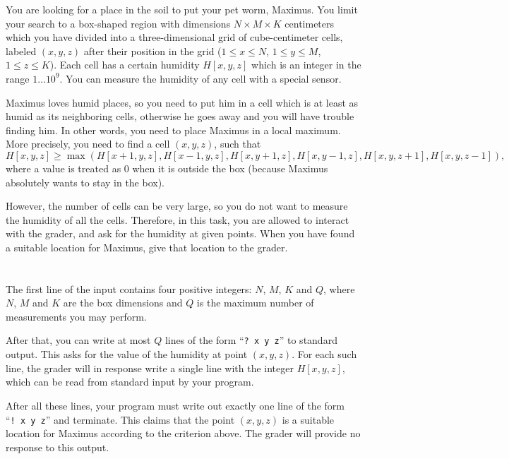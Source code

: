 \ifx\boi\undefined\fi
\def\version{jury-1}

You are looking for a place in the soil to put your pet worm, Maximus. You limit your search to a box-shaped region with dimensions $N \times M \times K$ centimeters which you have divided into a three-dimensional grid of cube-centimeter cells, labeled $(x,y,z)$ after their position in the grid ($1 \le x \le N$, $1 \le y \le M$, $1 \le z \le K$). Each cell has a certain humidity $H[x,y,z]$ which is an integer in the range $1 \dots 10^9$. You can measure the humidity of any cell with a special sensor.

Maximus loves humid places, so you need to put him in a cell which is at least as humid as its neighboring cells, otherwise he goes away and you will have trouble finding him.
In other words, you need to place Maximus in a local maximum.
More precisely, you need to find a cell $(x,y,z)$, such that
$$
H[x,y,z] \ge \max(H[x+1,y,z], H[x-1,y,z], H[x,y+1,z], H[x,y-1,z], H[x,y,z+1], H[x,y,z-1]),
$$
where a value is treated as $0$ when it is outside the box (because Maximus absolutely wants to stay in the box).

However, the number of cells can be very large, so you do not want to measure the humidity of all the cells. Therefore, in this task, you are allowed to interact with the grader, and ask for the humidity at given points.
When you have found a suitable location for Maximus, give that location to the grader.

\section*{\interactivity}
The first line of the input contains four positive integers: $N$, $M$, $K$ and $Q$, where $N$, $M$ and $K$ are the box dimensions and $Q$ is the maximum number of measurements you may perform.

After that, you can write at most $Q$ lines of the form ``\texttt{?\ x y z}'' to standard output.
This asks for the value of the humidity at point $(x, y, z)$.
For each such line, the grader will in response write a single line with the integer $H[x,y,z]$, which can be read from standard input by your program.

After all these lines, your program must write out exactly one line of the form ``\texttt{!\ x y z}'' and terminate.
This claims that the point $(x, y, z)$ is a suitable location for Maximus according to the criterion above.
The grader will provide no response to this output.

